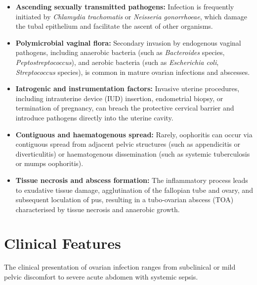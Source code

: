 \begin{itemize}
    \item \textbf{Ascending sexually transmitted pathogens:} Infection is frequently initiated by \textit{Chlamydia trachomatis} or \textit{Neisseria gonorrhoeae}, which damage the tubal epithelium and facilitate the ascent of other organisms.
    \item \textbf{Polymicrobial vaginal flora:} Secondary invasion by endogenous vaginal pathogens, including anaerobic bacteria (such as \textit{Bacteroides} species, \textit{Peptostreptococcus}), and aerobic bacteria (such as \textit{Escherichia coli}, \textit{Streptococcus} species), is common in mature ovarian infections and abscesses.
    \item \textbf{Iatrogenic and instrumentation factors:} Invasive uterine procedures, including intrauterine device (IUD) insertion, endometrial biopsy, or termination of pregnancy, can breach the protective cervical barrier and introduce pathogens directly into the uterine cavity.
    \item \textbf{Contiguous and haematogenous spread:} Rarely, oophoritis can occur via contiguous spread from adjacent pelvic structures (such as appendicitis or diverticulitis) or haematogenous dissemination (such as systemic tuberculosis or mumps oophoritis).
    \item \textbf{Tissue necrosis and abscess formation:} The inflammatory process leads to exudative tissue damage, agglutination of the fallopian tube and ovary, and subsequent loculation of pus, resulting in a tubo-ovarian abscess (TOA) characterised by tissue necrosis and anaerobic growth.
\end{itemize}

\section*{Clinical Features}
The clinical presentation of ovarian infection ranges from subclinical or mild pelvic discomfort to severe acute abdomen with systemic sepsis.

